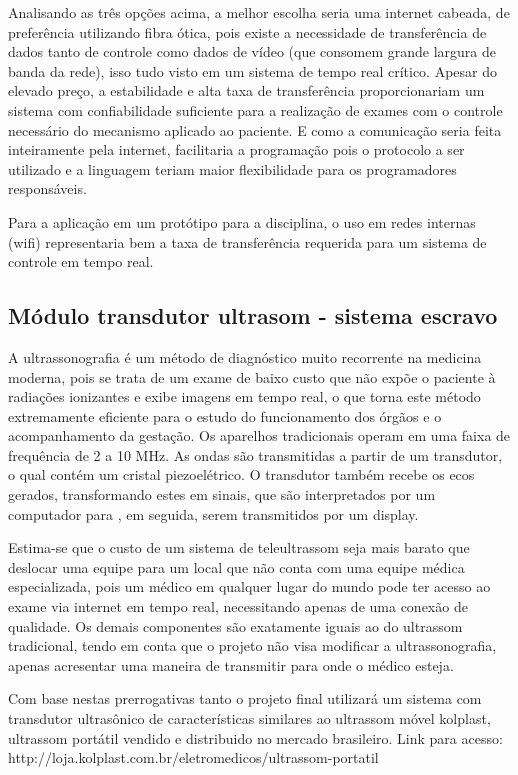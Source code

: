 \documentclass[a4paper]{article}
\begin{document}
Analisando as três opções acima, a melhor escolha seria uma internet cabeada, de preferência utilizando fibra ótica, pois existe a necessidade de transferência de dados tanto de controle como dados de vídeo (que consomem grande largura de banda da rede), isso tudo visto em um sistema de tempo real crítico. Apesar do elevado preço, a estabilidade e alta taxa de transferência proporcionariam um sistema com confiabilidade suficiente para a realização de exames com o controle necessário do mecanismo aplicado ao paciente. E como a comunicação seria feita inteiramente pela internet, facilitaria a programação pois o protocolo a ser utilizado e a linguagem teriam maior flexibilidade para os programadores responsáveis. 

Para a aplicação em um protótipo para a disciplina, o uso em redes internas (wifi) representaria bem a taxa de transferência requerida para um sistema de controle em tempo real. 

\subsection{Módulo transdutor ultrasom - sistema escravo}

A ultrassonografia é um método de diagnóstico muito recorrente na medicina moderna, pois se trata de um exame de baixo custo que não expõe o paciente à radiações ionizantes e exibe imagens em tempo real, o que torna este método extremamente eficiente para o estudo do funcionamento dos órgãos e o acompanhamento da gestação. Os aparelhos tradicionais operam em uma faixa de frequência de  2 a 10 MHz. As ondas são transmitidas a partir de um transdutor, o qual contém um cristal piezoelétrico. O transdutor também recebe os ecos gerados, transformando estes em sinais, que são interpretados por um computador para , em seguida, serem transmitidos por um display.

Estima-se que o custo de um sistema de teleultrassom seja mais barato que deslocar uma equipe para um local que não conta com uma equipe médica especializada, pois um médico em qualquer lugar do mundo pode ter acesso ao exame via internet em tempo real, necessitando apenas de uma conexão de qualidade. Os demais componentes são exatamente iguais ao do ultrassom tradicional, tendo em conta que o projeto não visa modificar a ultrassonografia, apenas acresentar uma maneira de transmitir para onde o médico esteja.

Com base nestas prerrogativas tanto o projeto final utilizará um sistema com transdutor ultrasônico de características similares ao ultrassom móvel kolplast, ultrassom portátil vendido e distribuido no mercado brasileiro. Link para acesso: http://loja.kolplast.com.br/eletromedicos/ultrassom-portatil
\end{document}
